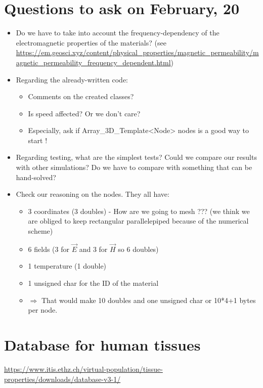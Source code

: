 \documentclass[12 pt]{report}
\begin{document}
\tableofcontents
\newpage
\listoffigures
\newpage
\listoftables
\newpage

\section{Questions to ask on February, 20}

\begin{itemize}
	\item Do we have to take into account the frequency-dependency of the electromagnetic properties of the materials? (see \url{https://em.geosci.xyz/content/physical_properties/magnetic_permeability/magnetic_permeability_frequency_dependent.html})
	\item Regarding the already-written code:
		\begin{itemize}
			\item Comments on the created classes?
			\item Is speed affected? Or we don't care?
			\item Especially, ask if Array\_3D\_Template<Node> nodes is a good way to start !
		\end{itemize}
	\item Regarding testing, what are the simplest tests? Could we compare our results with other simulations? Do we have to compare with something that can be hand-solved?
	\item Check our reasoning on the nodes. They all have:
		\begin{itemize}
			\item 3 coordinates (3 doubles) - How are we going to mesh ??? (we think we are obliged to keep rectangular parallelepiped because of the numerical scheme)
			\item 6 fields (3 for $\vec{E}$ and 3 for $\vec{H}$ so 6 doubles)
			\item 1 temperature (1 double)
			\item 1 unsigned char for the ID of the material
			\item $\Rightarrow$ That would make 10 doubles and one unsigned char or 10*4+1 bytes per node.
		\end{itemize}
\end{itemize}

\section{Database for human tissues}

\url{https://www.itis.ethz.ch/virtual-population/tissue-properties/downloads/database-v3-1/}
\end{document}

